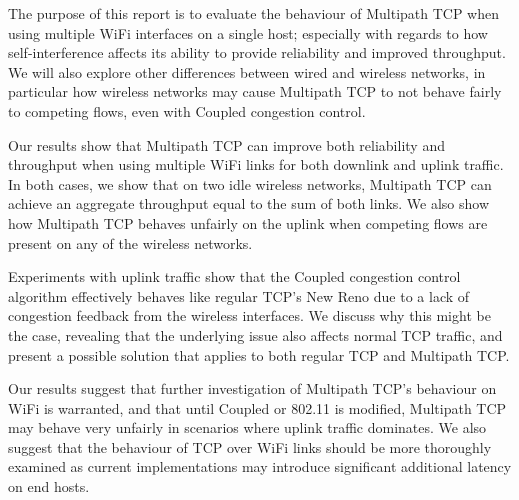 \documentclass[12pt,a4paper]{article}
\begin{document}
The purpose of this report is to evaluate the behaviour of Multipath TCP when
using multiple WiFi interfaces on a single host; especially with regards to
how self-interference affects its ability to provide reliability and improved
throughput. We will also explore other differences between wired and wireless
networks, in particular how wireless networks may cause Multipath TCP to not
behave fairly to competing flows, even with Coupled congestion control.

Our results show that Multipath TCP can improve both reliability and throughput
when using multiple WiFi links for both downlink and uplink traffic. In both
cases, we show that on two idle wireless networks, Multipath TCP can achieve an
aggregate throughput equal to the sum of both links. We also show how Multipath
TCP behaves unfairly on the uplink when competing flows are present on any of
the wireless networks.

Experiments with uplink traffic show that the Coupled congestion control
algorithm effectively behaves like regular TCP's New Reno due to a lack of
congestion feedback from the wireless interfaces. We discuss why this might be
the case, revealing that the underlying issue also affects normal TCP traffic,
and present a possible solution that applies to both regular TCP and Multipath
TCP.

Our results suggest that further investigation of Multipath TCP's behaviour on
WiFi is warranted, and that until Coupled or 802.11 is modified, Multipath TCP
may behave very unfairly in scenarios where uplink traffic dominates. We also
suggest that the behaviour of TCP over WiFi links should be more thoroughly
examined as current implementations may introduce significant additional latency
on end hosts.
\end{document}
